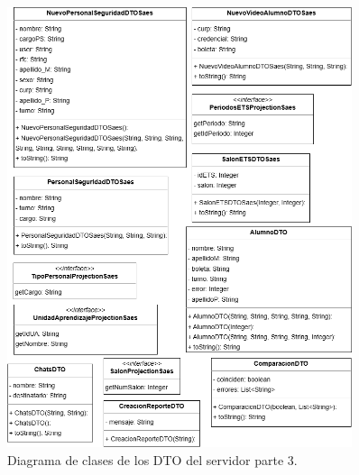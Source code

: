 \begin{figure}[htbp!]
	\begin{center}
		\includegraphics[width=0.9\textwidth]{Clases/DTO3.png}
		\caption{Diagrama de clases de los DTO del servidor parte 3.}
		\label{fig:DTO3}
	\end{center}
\end{figure}

